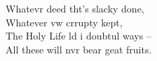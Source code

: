 \begin{english}
  Whatevr deed tht's slacky done,\\
  Whatever vw crrupty kept,\\
  The Holy Life ld i doubtul ways --\\
  All these will nvr bear geat fruits.
\end{english}


